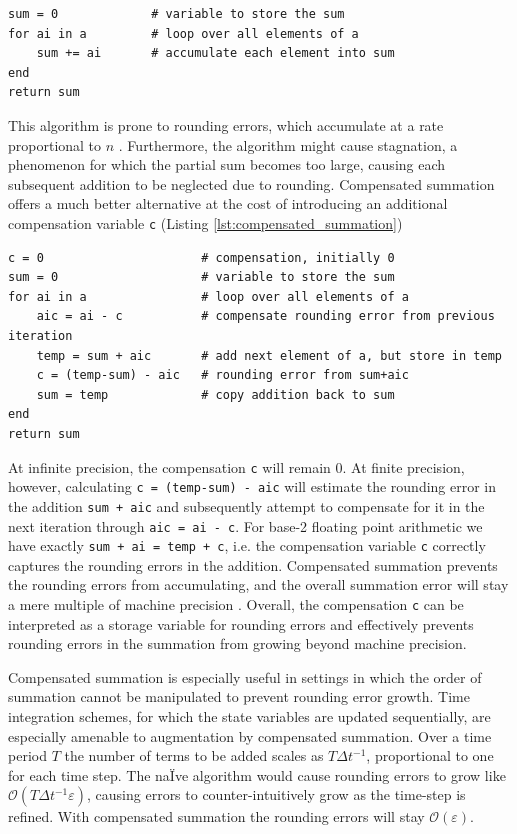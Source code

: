 \vspace{11pt}
\begin{lstlisting}[language=JuliaLocal,caption={\textbf{A naïve summation algorithm.}}]
sum = 0             # variable to store the sum
for ai in a         # loop over all elements of a
	sum += ai       # accumulate each element into sum   
end
return sum
\end{lstlisting}

This algorithm is prone to rounding errors, which accumulate at a rate proportional to $n$ \citep{Higham1993}.
Furthermore, the algorithm might cause stagnation, a phenomenon for which the partial sum becomes too large,
causing each subsequent addition to be neglected due to rounding. Compensated summation offers a much
better alternative at the cost of introducing an additional compensation variable \texttt{c} (Listing \ref{lst:compensated_summation})

\vspace{11pt}
\begin{lstlisting}[language=JuliaLocal,caption={\textbf{An algorithm for compensated summation.}},label=lst:compensated_summation]
c = 0                      # compensation, initially 0
sum = 0                    # variable to store the sum
for ai in a                # loop over all elements of a
	aic = ai - c           # compensate rounding error from previous iteration
 	temp = sum + aic       # add next element of a, but store in temp
	c = (temp-sum) - aic   # rounding error from sum+aic
 	sum = temp             # copy addition back to sum
end
return sum
\end{lstlisting}

At infinite precision, the compensation \texttt{c} will remain 0. At finite precision, however, calculating \texttt{c = (temp-sum) - aic}
will estimate the rounding error in the addition \texttt{sum + aic} and subsequently attempt to compensate for it in the next iteration
through \texttt{aic = ai - c}. For base-2 floating point arithmetic we have exactly \texttt{sum + ai = temp + c}, i.e. the compensation
variable \texttt{c} correctly captures the rounding errors in the addition. Compensated summation prevents the rounding errors
from accumulating, and the overall summation error will stay a mere multiple of machine precision \citep{Higham1993}. Overall,
the compensation \texttt{c} can be interpreted as a storage variable for rounding errors and effectively prevents rounding errors
in the summation from growing beyond machine precision.

Compensated summation is especially useful in settings in which the order of summation cannot be manipulated to prevent
rounding error growth. Time integration schemes, for which the state variables are updated sequentially, are especially
amenable to augmentation by compensated summation. Over a time period $T$ the number of terms to be added scales
as $T\Delta t^{-1}$, proportional to one for each time step. The naÏve algorithm would cause rounding errors to grow like
$\mathcal{O}(T\Delta t^{-1}\varepsilon)$, causing errors to counter-intuitively grow as the time-step is refined.
With compensated summation the rounding errors will stay $\mathcal{O}(\varepsilon)$.

